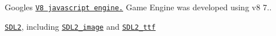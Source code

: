 
\begin{DoxyItemize}
\item Google\textquotesingle{}s \href{https://v8.dev/docs/build}{\tt V8 javascript engine.} Game Engine was developed using v8 7..
\item \href{https://www.libsdl.org/}{\tt S\+D\+L2}, including \href{https://www.libsdl.org/projects/SDL_image/}{\tt S\+D\+L2\+\_\+image} and \href{https://www.libsdl.org/projects/SDL_ttf/}{\tt S\+D\+L2\+\_\+ttf} 
\end{DoxyItemize}